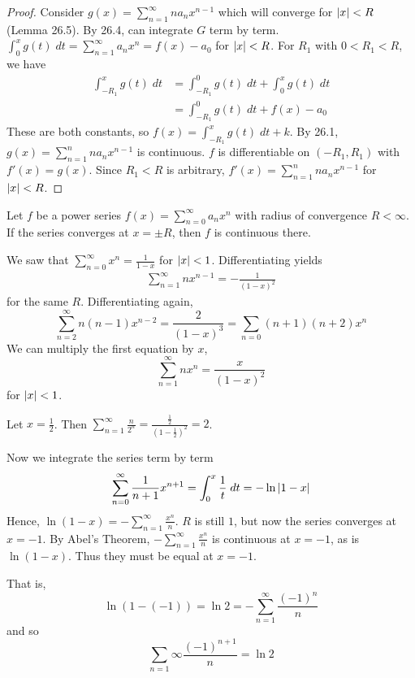\documentclass{article}
\begin{document}
      \begin{proof}
        Consider $g(x) = \sum_{n=1}^\infty na_nx^{n-1}$ which will converge for $\abs{x} < R$ (Lemma 26.5). By 26.4, can integrate $G$ term by term. $\int_0^x g(t) \; dt = \sum_{n=1}^\infty a_nx^n = f(x) - a_0$ for $\abs{x} < R$. For $R_1$ with $0 < R_1 < R$, we have
        \begin{align*}
          \int_{-R_1}^x g(t) \; dt &= \int_{-R_1}^0 g(t) \; dt + \int_0^x g(t) \; dt\\
          &= \int_{-R_1}^0 g(t) \; dt + f(x) - a_0
        \end{align*}
        These are both constants, so $f(x) = \int_{-R_1}^x g(t) \; dt + k$. By 26.1, $g(x) = \sum_{n=1}^n na_nx^{n-1}$ is continuous. $f$ is differentiable on $(-R_1, R_1)$ with $f'(x) = g(x)$. Since $R_1 < R$ is arbitrary, $f'(x) = \sum_{n=1}^n na_nx^{n-1}$ for $\abs{x} < R$.
      \end{proof}
      \begin{cthm}
        Let $f$ be a power series $f(x) = \sum_{n=0}^\infty a_nx^n$ with radius of convergence $R < \infty$. If the series converges at $x = \pm R$, then $f$ is continuous there.
      \end{cthm}
      \begin{example}
        We saw that $\sum_{n=0}^\infty x^n = \frac{1}{1-x}$ for $\abs{x} < 1$. Differentiating yields
        \begin{align*}
          \sum_{n=1}^\infty nx^{n-1} = -\frac{1}{(1-x)^2}
        \end{align*} for the same $R$. Differentiating again, \[
          \sum_{n=2}^\infty n(n-1)x^{n-2} = \frac{2}{(1-x)^3} = \sum_{n=0}(n+1)(n+2)x^n
        \]
        We can multiply the first equation by $x$, \[
          \sum_{n=1}^\infty nx^n = \frac{x}{(1-x)^2}
        \] for $\abs{x} < 1$.

        Let $x = \frac{1}{2}$. Then $\sum_{n=1}^\infty \frac{n}{2^n} = \frac{\frac{1}{2}}{\left(1-\frac{1}{2}\right)^2} = 2$.

        Now we integrate the series term by term\[
          \sum_{n=0}^\infty \frac{1}{n+1}x^{n+1} = \int_0^x \frac{1}{t} \; dt = -\ln\abs{1-x}
        \]
        Hence, $\ln(1-x) = -\sum_{n=1}^\infty \frac{x^n}{n}$. $R$ is still $1$, but now the series converges at $x=-1$. By Abel's Theorem, $-\sum_{n=1}^\infty \frac{x^n}{n}$ is continuous at $x=-1$, as is $\ln (1-x)$. Thus they must be equal at $x=-1$.

        That is, \[
          \ln (1 -(-1)) = \ln 2 = -\sum_{n=1}^\infty \frac{(-1)^n}{n}
        \] and so \[
          \sum_{n=1}\infty \frac{(-1)^{n+1}}{n} = \ln 2
        \]
      \end{example}
\end{document}
